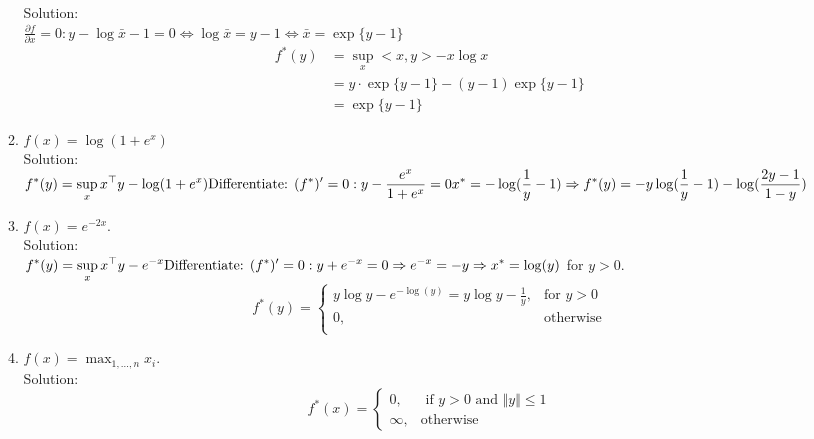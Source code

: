 \documentclass[12pt]{amsart}
\newcommand{\norm}[1]{\Vert #1 \Vert}
\begin{document}
\begin{enumerate}
\begin{enumerate}
\noindent
Solution:\\
$\frac{\partial f}{\partial x} = 0: y - \log \bar{x} - 1 = 0 \Leftrightarrow \log \bar{x} = y-1 \Leftrightarrow \bar{x} = \exp\{y-1\}$\\
\begin{align*}
f^*(y) &= \sup_x <x,y> - x \log x \\
         &= y \cdot \exp\{y-1\} - (y-1) \exp\{y-1\} \\
	 &= \exp\{y-1\}
\end{align*}

\item $f(x) = \log(1 + e^x)$\\

\noindent
Solution:\\
$\displaystyle f^*(y) = \sup_x x^\top y - \log(1 + e^x) \\
\text{Differentiate: } (f^*)' = 0: y - \frac{e^x}{1 + e^x} = 0\\
x^* = - \log(\frac{1}{y} - 1)\\
\Rightarrow f^*(y) = - y \log(\frac{1}{y} - 1) - \log(\frac{2y-1}{1-y})$\\

\item $f(x) = e^{-2x}$.\\

\noindent
Solution:\\
$\displaystyle f^*(y) = \sup_x x^\top y - e^{-x} \\
\text{Differentiate: } (f^*)' = 0: y + e^{-x} = 0 \Rightarrow e^{-x} = -y \Rightarrow x^* = \log (y)$ for $y > 0$.\\
\begin{equation*}
f^*(y) = \begin{cases}
y \log y - e^{- \log(y)} = y \log y - \frac{1}{y},& \text{for $y > 0$}\\
0, & \text{otherwise}\\
	\end{cases}
\end{equation*}

\item $f(x) = \max_{1, \dots, n} x_i$. \\


\noindent
Solution:\\
\begin{equation*}
f^*(x) = \begin{cases}
0, & \text{ if $y>0$ and $\norm{y} \leq 1$}\\
\infty, & \text{otherwise}
\end{cases}
\end{equation*}


\end{enumerate}
\end{enumerate}
\end{document}
